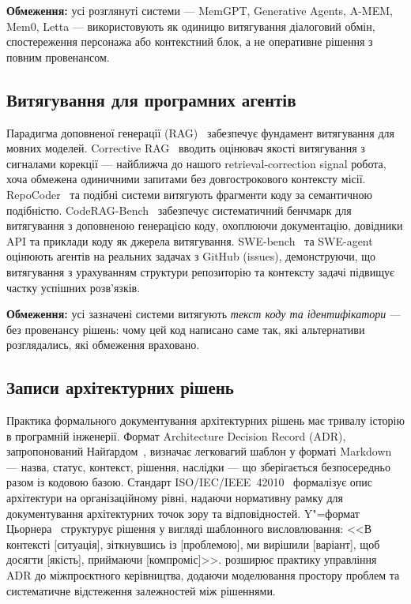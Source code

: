 \documentclass[11pt]{article}
\begin{document}
\textbf{Обмеження:} усі розглянуті системи --- MemGPT, Generative Agents, A-MEM, Mem0, Letta ---
використовують як одиницю витягування діалоговий обмін, спостереження персонажа
або контекстний блок, а не оперативне рішення з повним провенансом.

\subsection{Витягування для програмних агентів}

Парадигма доповненої генерації (RAG)~\citep{lewis2020rag} забезпечує фундамент витягування для мовних моделей.
Corrective RAG~\citep{yan2024crag} вводить оцінювач якості витягування з сигналами корекції --- найближча до нашого retrieval-correction signal робота, хоча обмежена одиничними запитами без довгострокового контексту місії.
RepoCoder~\citep{zhang2023repocoder} та подібні системи витягують фрагменти коду за семантичною подібністю.
CodeRAG-Bench~\citep{wang2024coderagbench} забезпечує систематичний бенчмарк для витягування з доповненою генерацією коду, охоплюючи документацію, довідники API та приклади коду як джерела витягування.
SWE-bench~\citep{jimenez2024swebench} та SWE-agent~\citep{yang2024sweagent} оцінюють агентів на реальних задачах з GitHub (issues), демонструючи, що витягування з урахуванням структури репозиторію та контексту задачі підвищує частку успішних розв'язків.

\textbf{Обмеження:} усі зазначені системи витягують \emph{текст коду та ідентифікатори} --- без провенансу рішень: чому цей код написано саме так, які альтернативи розглядались, які обмеження враховано.

\subsection{Записи архітектурних рішень}
\label{sec:related-adr}

Практика формального документування архітектурних рішень має тривалу історію в програмній інженерії.
Формат Architecture Decision Record (ADR), запропонований Найґардом~\citep{nygard2011adr}, визначає легковагий шаблон у форматі Markdown --- назва, статус, контекст, рішення, наслідки --- що зберігається безпосередньо разом із кодовою базою.
Стандарт ISO/IEC/IEEE~42010~\citep{iso42010} формалізує опис архітектури на організаційному рівні, надаючи нормативну рамку для документування архітектурних точок зору та відповідностей.
Y"=формат Цьорнера~\citep{zorner2015softwarearchitekturen} структурує рішення у вигляді шаблонного висловлювання: <<В контексті [ситуація], зіткнувшись із [проблемою], ми вирішили [варіант], щоб досягти [якість], приймаючи [компроміс]>>.
\citet{zimmermann2015architectural} розширює практику управління ADR до міжпроєктного керівництва, додаючи моделювання простору проблем та систематичне відстеження залежностей між рішеннями.
\end{document}
